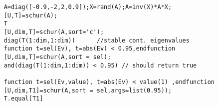 \begin{examples}
  \begin{Verbatim}
    A=diag([-0.9,-2,2,0.9]);X=rand(A);A=inv(X)*A*X;
    [U,T]=schur(A);
    T
    [U,dim,T]=schur(A,sort='c');
    diag(T(1:dim,1:dim))      //stable cont. eigenvalues
    function t=sel(Ev), t=abs(Ev) < 0.95,endfunction
    [U,dim,T]=schur(A,sort = sel);
    and(diag(T(1:dim,1:dim)) < 0.95) // should return true
    
    function t=sel(Ev,value), t=abs(Ev) < value(1) ,endfunction
    [U,dim,T1]=schur(A,sort = sel,args=list(0.95));
    T.equal[T1]
  \end{Verbatim}
\end{examples}
\begin{manseealso}
   
\end{manseealso}
